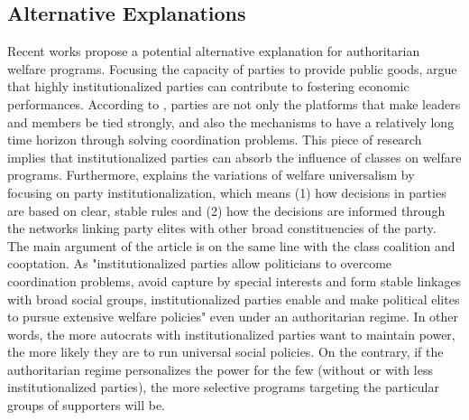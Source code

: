 \documentclass[11pt]{article}
\begin{document}
\subsection{Alternative Explanations}

Recent works propose a potential alternative explanation for authoritarian welfare programs. Focusing the capacity of parties to provide public goods, \citet{Bizzarro2018} argue that highly institutionalized parties can contribute to fostering economic performances. According to \citet{Bizzarro2018}, parties are not only the platforms that make leaders and members be tied strongly, and also the mechanisms to have a relatively long time horizon through solving coordination problems. This piece of research implies that institutionalized parties can absorb the influence of classes on welfare programs. Furthermore, \citet{Rasmussen2019} explains the variations of welfare universalism by focusing on party institutionalization, which means (1) how decisions in parties are based on clear, stable rules and (2) how the decisions are informed through the networks linking party elites with other broad constituencies of the party. The main argument of the article is on the same line with the class coalition and cooptation. As "institutionalized parties allow politicians to overcome coordination problems, avoid capture by special interests and form stable linkages with broad social groups, institutionalized parties enable and make political elites to pursue extensive welfare policies" even under an authoritarian regime. In other words, the more autocrats with institutionalized parties want to maintain power, the more likely they are to run universal social policies. On the contrary, if the authoritarian regime personalizes the power for the few (without or with less institutionalized parties), the more selective programs targeting the particular groups of supporters will be. 
\end{document}
